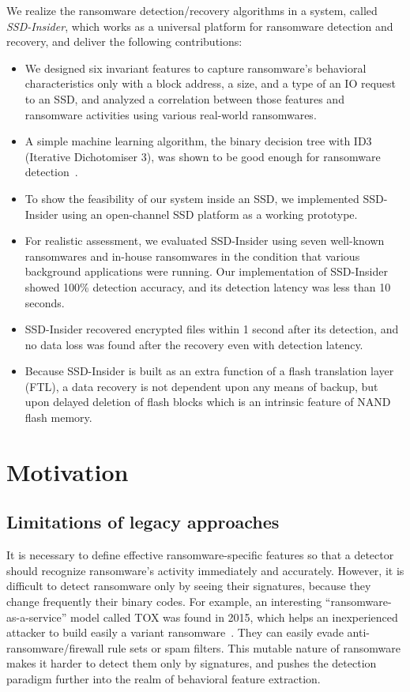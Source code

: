 \documentclass[conference]{IEEEtran}
\newcommand{\ours}{SSD-Insider}
\begin{document}
We realize the ransomware detection/recovery algorithms in a
system, called \textit{SSD-Insider}, which works as a universal
platform for ransomware detection and recovery, and deliver the
following contributions:
\begin{itemize}
\item We designed six invariant features to capture ransomware's
behavioral characteristics only with a block address, a size, and
a type of an IO request to an SSD, and analyzed a correlation
between those features and ransomware activities using various
real-world ransomwares.
\item A simple machine learning algorithm, the binary decision tree
with ID3 (Iterative Dichotomiser 3), was shown to be good enough
for ransomware detection~\cite{quinlan86}.
\item To show the feasibility of our system inside an SSD, we
implemented \ours{} using an open-channel SSD platform as a working
prototype.
\item For realistic assessment, we evaluated \ours{} using seven
well-known ransomwares and in-house ransomwares in the condition
that various background applications were running.  Our
implementation of \ours{} showed 100\% detection accuracy, and its
detection latency was less than 10 seconds. 
\item \ours{} recovered encrypted files within 1 second after its
detection, and no data loss was found after the recovery even with
detection latency.
\item Because \ours{} is built as an extra function of a flash
translation layer (FTL), a data recovery is not dependent upon any
means of backup, but upon delayed deletion of flash blocks which is
an intrinsic feature of NAND flash memory.
\end{itemize}

\section{Motivation}

\subsection{Limitations of legacy approaches}

It is necessary to define effective ransomware-specific features 
so that a detector should recognize ransomware's activity immediately and accurately. 
However, it is difficult to detect ransomware only by seeing their signatures, 
because they change frequently their binary codes. 
For example,  an interesting ``ransomware-as-a-service'' model called TOX was found in 2015, 
which helps an inexperienced attacker to build easily a variant ransomware~\cite{walter15}. 
They can easily evade anti-ransomware/firewall rule sets or spam filters. 
This mutable nature of ransomware makes it harder to detect them only by signatures,
and pushes the detection paradigm further into the realm of behavioral feature extraction.
\end{document}
